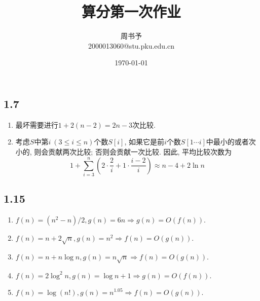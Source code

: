 \documentclass[8pt]{article}
\title{\heiti\zihao{1} 算分第一次作业}
\author{\kaishu\zihao{-3} 周书予\\2000013060@stu.pku.edu.cn}
\date{\today}
\def\le{\leqslant}
\begin{document}
\pagestyle{fancy}


\maketitle

\section{}
\iffalse
\subsection*{1.2}
\begin{enumerate}
	\item 第$i$轮\texttt{for}循环中需要进行$n - i$次比较, 因此最坏情况下比较次数是$\sum_{i=1}^{n-1}(n-i) = \frac{n(n-1)}{2}$.
	\item 当输入的$n$个数以严格降序排列时, 交换次数达到最大, 也为$\frac{n(n-1)}{2}$.
\end{enumerate}

\subsection*{1.6}
该算法实现了对于多项式$P(t) = \sum_{i=0}^{n}P[i]t^i$求$x$处的点值.

该算法需要$2n$次乘法与$n$次加法.
\fi

\subsection*{1.7}
\begin{enumerate}
	\item 最坏需要进行$1 + 2(n-2) = 2n-3$次比较.
	\item 考虑$S$中第$i\ (3 \le i \le n)$个数$S[i]$, 如果它是前$i$个数$S[1 \cdots i]$中最小的或者次小的, 则会贡献两次比较; 否则会贡献一次比较. 因此, 平均比较次数为$$1 + \sum_{i=3}^{n}\left(2\cdot \frac{2}{i} + 1 \cdot \frac{i-2}{i}\right) \approx n-4 + 2\ln n$$
\end{enumerate}

\iffalse
\subsection*{1.15}
\begin{enumerate}
	\item $f(n) = (n^2-n)/2, g(n) = 6n \Rightarrow g(n) = O(f(n)).$
	\item $f(n) = n + 2\sqrt n, g(n) = n^2 \Rightarrow f(n) = O(g(n)).$
	\item $f(n) = n + n\log n, g(n) = n\sqrt n \Rightarrow f(n) = O(g(n)).$
	\item $f(n) = 2\log^2n, g(n) = \log n + 1 \Rightarrow g(n) = O(f(n)).$
	\item $f(n) = \log(n!), g(n) = n^{1.05} \Rightarrow f(n) = O(g(n)).$
\end{enumerate}
\end{document}
